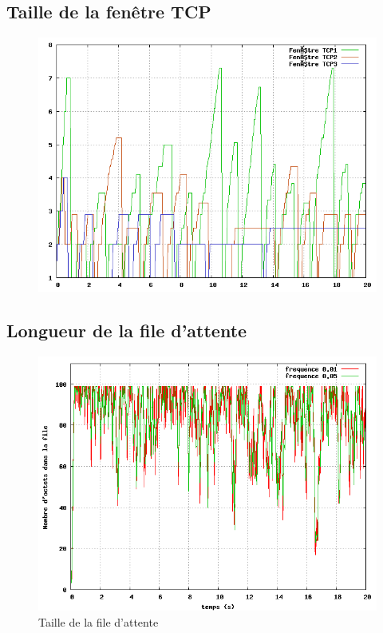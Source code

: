 \documentclass[a4paper]{article}
\begin{document}
\subsection{Taille de la fenêtre TCP}
\begin{figure}[h]
\includegraphics[width=\textwidth]{windowSize}
\end{figure}

\subsection{Longueur de la file d'attente}
\begin{figure}[h]
\includegraphics[width=\textwidth]{queueSize}
\caption{Taille de la file d'attente}
\end{figure}
\end{document}
